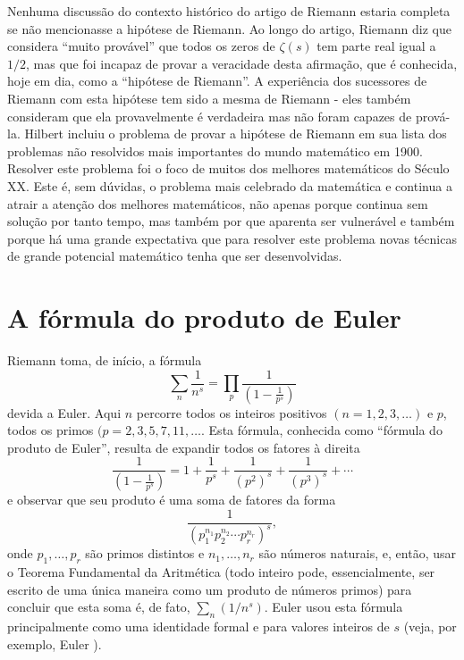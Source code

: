     Nenhuma discussão do contexto histórico do artigo de Riemann estaria 
    completa se não mencionasse a hipótese de Riemann. Ao longo do artigo, 
    Riemann diz que considera ``muito provável'' que todos os zeros de 
    $\zeta(s)$ tem parte real igual a $1/2$, mas que foi incapaz de 
    provar a veracidade desta afirmação, que é conhecida, hoje em dia, 
    como a ``hipótese de Riemann''. A experiência dos sucessores de Riemann 
    com esta hipótese tem sido a mesma de Riemann - eles também consideram 
    que ela provavelmente é verdadeira mas não foram capazes de prová-la. 
    Hilbert incluiu o problema de provar a hipótese de Riemann em sua 
    lista \cite{hilbert1902problemes} dos problemas não resolvidos 
    mais importantes do mundo matemático em 1900. 
    Resolver este problema foi o foco de muitos dos melhores 
    matemáticos do Século XX. Este é, sem dúvidas, o 
    problema mais celebrado da matemática e continua a atrair 
    a atenção dos melhores matemáticos, não apenas porque 
    continua sem solução por tanto tempo, mas também por 
    que aparenta ser vulnerável e também porque há uma grande expectativa que para resolver este problema novas técnicas de grande potencial matemático
    tenha que ser desenvolvidas.
    
    
    
    \section{A fórmula do produto de Euler}
    
    
    Riemann toma, de início, a fórmula
    \begin{equation}
        \label{Euler-prod}
        \sum_{n} \frac{1}{n^s} = \prod_{p} \frac{1}{\left( 1 - \frac{1}{p^s}\right)}
    \end{equation}
    devida a Euler. Aqui $n$ percorre todos os inteiros positivos $(n=1,2,3, \dots)$ e $p$, 
    todos os primos $(p=2,3,5,7,11,\dots$. 
    Esta fórmula, conhecida como ``fórmula do produto de Euler'', resulta de expandir todos os fatores à direita
    $$\frac{1}{\left( 1 - \frac{1}{p^s}\right)} = 1 + \frac{1}{p^s} + \frac{1}{(p^2)^s} + \frac{1}{(p^3)^s} + \cdots $$
    e observar que seu produto é uma soma de fatores da forma
    $$\frac{1}{(p_1^{n_1} p_2^{n_2} \cdots p_r^{n_r})^s},$$
    onde $p_1, \dots, p_r$ são primos distintos e $n_1, \dots, n_r$ são números naturais, e, então, usar o Teorema Fundamental da Aritmética (todo inteiro pode, essencialmente, ser escrito de uma única maneira como um produto de números primos) para concluir que esta soma é, de fato, $\sum_{n}(1/n^s)$. Euler usou esta fórmula principalmente como uma identidade formal e para valores inteiros de $s$ (veja, por exemplo, Euler \cite{MR0016336}).
    
